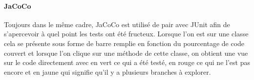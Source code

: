 \paragraph{JaCoCo}
Toujours dans le même cadre, JaCoCo est utilisé de pair avec JUnit afin de s'apercevoir à quel point les tests ont été fructeux.
Lorsque l'on est sur une classe cela se présente sous forme de barre remplie en fonction du pourcentage de code couvert et lorsque l'on clique sur une méthode de cette classe, on obtient une vue sur le code directement avec en vert ce qui a été testé, en rouge ce qui ne l'est pas encore et en jaune qui signifie qu'il y a plusieurs branches à explorer.